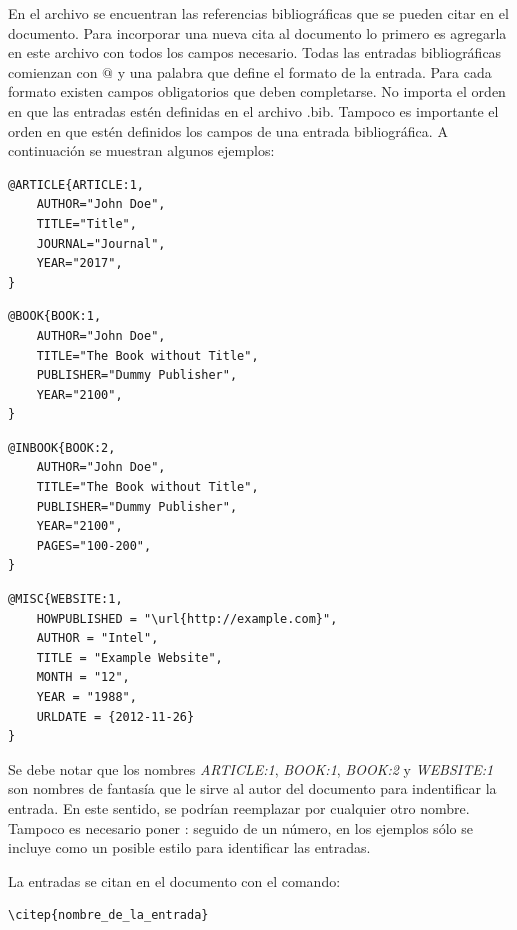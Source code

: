En el archivo  se encuentran las referencias bibliográficas que se pueden citar en el documento.  Para incorporar una nueva cita al documento lo primero es agregarla en este archivo con todos los campos necesario.  Todas las entradas bibliográficas comienzan con $@$ y una palabra que define el formato de la entrada.  Para cada formato existen campos obligatorios que deben completarse. No importa el orden en que las entradas estén definidas en el archivo .bib.  Tampoco es importante el orden en que estén definidos los campos de una entrada bibliográfica. A continuación se muestran algunos ejemplos:

\begin{lstlisting}
@ARTICLE{ARTICLE:1,
    AUTHOR="John Doe",
    TITLE="Title",
    JOURNAL="Journal",
    YEAR="2017",
}
\end{lstlisting}



\begin{lstlisting}
@BOOK{BOOK:1,
    AUTHOR="John Doe",
    TITLE="The Book without Title",
    PUBLISHER="Dummy Publisher",
    YEAR="2100",
}
\end{lstlisting}


\begin{lstlisting}
@INBOOK{BOOK:2,
    AUTHOR="John Doe",
    TITLE="The Book without Title",
    PUBLISHER="Dummy Publisher",
    YEAR="2100",
    PAGES="100-200",
}
\end{lstlisting}


\begin{lstlisting}
@MISC{WEBSITE:1,
    HOWPUBLISHED = "\url{http://example.com}",
    AUTHOR = "Intel",
    TITLE = "Example Website",
    MONTH = "12",
    YEAR = "1988",
    URLDATE = {2012-11-26}
}
\end{lstlisting}

Se debe notar que los nombres \emph{ARTICLE:1}, \emph{BOOK:1}, \emph{BOOK:2} y \emph{WEBSITE:1} son nombres de fantasía que le sirve al autor del documento para indentificar la entrada. En este sentido, se podrían reemplazar por cualquier otro nombre.  Tampoco es necesario poner : seguido de un número, en los ejemplos sólo se incluye como un posible estilo para identificar las entradas.

La entradas se citan en el documento con el comando: 

\begin{verbatim}
\citep{nombre_de_la_entrada}
\end{verbatim}

